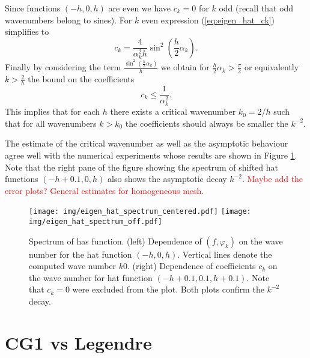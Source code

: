 \documentclass[a4paper,10pt]{article}
\newcommand{\inner}[2]{\ensuremath{\left(#1, #2\right)}}
\newcommand{\TODO}[1]{\textcolor{red}{#1}}
\begin{document}
  Since functions $(-h, 0, h)$ are even we have $c_k=0$ for $k$ odd (recall that
  odd wavenumbers belong to sines). For $k$ even expression
  (\ref{eq:eigen_hat_ck}) simplifies to
  \[
    c_k = \frac{4}{\alpha_k^2 h}\sin^2\left(\frac{h}{2}\alpha_k\right).
  \]
  Finally by considering the term
  $\frac{\sin^2\left(\frac{h}{2}\alpha_k\right)}{h}$
  we obtain for $\frac{h}{2}\alpha_k > \frac{\pi}{2}$ or equivalently 
  $k>\tfrac{2}{h}$ the bound on the coefficients
  \[
    c_k \leq \frac{1}{\alpha_k^2}.
  \]
  This implies that for each $h$ there exists a critical wavenumber $k_0=2/h$
  such that for all wavenumbers $k>k_0$ the coefficients should always be 
  smaller the $k^{-2}$.

  The estimate of the critical wavenumber as well as the asymptotic behaviour
  agree well with the numerical experiments whose results are shown in Figure
  \ref{fig:eig_hat_spectrum}. Note that the right pane of the figure showing
  the spectrum of shifted hat functions $(-h+0.1, 0, h)$ also shows the
  asymptotic decay $k^{-2}$.
  \TODO{Maybe add the error plots?}
  \TODO{General estimates for homogeneous mesh.}

  \begin{figure}
  \begin{center}
    \texttt{[image: img/eigen\_hat\_spectrum\_centered.pdf]}
    \texttt{[image: img/eigen\_hat\_spectrum\_off.pdf]}
  \end{center}
  \label{fig:eig_hat_spectrum}
  \caption{Spectrum of has function. (left) Dependence of $\inner{f}{\varphi_k}$
    on the wave number for the hat function $(-h, 0, h)$. Vertical lines denote
    the computed wave number $k0$. (right) Dependence of coefficients $c_k$ on
    the wave number for hat function $(-h+0.1, 0.1, h+0.1)$. Note that $c_k=0$
    were excluded from the plot. Both plots confirm the $k^{-2}$ decay.}
  \end{figure}
  \section{CG1 vs Legendre}

  
  
\end{document}

